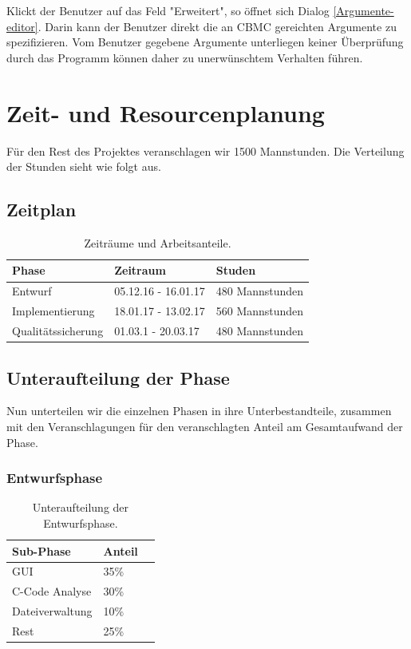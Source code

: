 \documentclass[a4paper]{scrreprt}
\begin{document}
Klickt der \gls{Benutzer} auf das Feld "Erweitert", so öffnet sich Dialog \ref{Argumente-editor}. Darin kann der \gls{Benutzer} direkt die an \ac{CBMC} gereichten Argumente zu spezifizieren. Vom \gls{Benutzer} gegebene Argumente unterliegen keiner Überprüfung durch das Programm können daher zu unerwünschtem Verhalten führen.

\chapter{Zeit- und Resourcenplanung}

Für den Rest des Projektes veranschlagen wir 1500 Mannstunden. Die Verteilung der Stunden sieht wie folgt aus.

\section{Zeitplan}

\begin{table}[H]
\centering
  \begin{tabular}{|p{3cm}|P{2cm}|P{2cm}|}
    Phase & Zeitraum & Studen \\ \hline
    Entwurf & 05.12.16 - 16.01.17 & 480 Mannstunden \\ \hline
    Implementierung & 18.01.17 - 13.02.17 & 560 Mannstunden \\ \hline
    Qualitätssicherung & 01.03.1 - 20.03.17 & 480 Mannstunden \\
  \end{tabular}
  \newline\newline
  \caption{Zeiträume und Arbeitsanteile.}\label{tab1}
\end{table}


\section{Unteraufteilung der Phase}
Nun unterteilen wir die einzelnen Phasen in ihre Unterbestandteile,
zusammen mit den Veranschlagungen für den veranschlagten Anteil am Gesamtaufwand der Phase.

\subsection{Entwurfsphase}

\begin{table}[H]
\centering
  \begin{tabular}{|p{3cm}|P{2cm}|P{2cm}|}
    Sub-Phase & Anteil \\ \hline
    GUI & 35\%\\ \hline
    C-Code Analyse & 30\%\\ \hline
    Dateiverwaltung & 10\%\\ \hline
    Rest & 25\%\\
  \end{tabular}
  \newline\newline
  \caption{Unteraufteilung der Entwurfsphase.}\label{entw}
\end{table}
\end{document}
